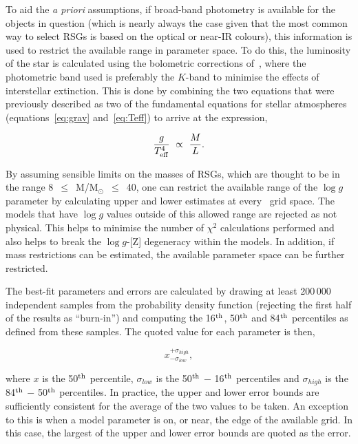 To aid the {\it a priori} assumptions, if broad-band photometry is available for the objects in question
(which is nearly always the case given that the most common way to select RSGs is based on the optical or near-IR colours), this information is used to restrict the available range in parameter space.
To do this, the luminosity of the star is calculated using the bolometric corrections of~\citet{2013ApJ...767....3D}, where the photometric band used is preferably the $K$-band to minimise the effects of interstellar extinction.
This is done by combining the two equations that were previously described as two of the fundamental equations for stellar atmospheres (equations~\ref{eq:grav} and~\ref{eq:Teff}) to arrive at the expression,

\begin{equation}
    \frac{g}{T^{4}_{\rm eff}}~\propto~\frac{M}{L}.
\end{equation}

By assuming sensible limits on the masses of RSGs, which are thought to be in the range 8~$\leq$~M/M$_{\odot}$~$\leq$~40, one can restrict the available range of the $\log g$ parameter by calculating upper and lower estimates at every \Teff~grid space.
The models that have $\log g$ values outside of this allowed range are rejected as not physical.
This helps to minimise the number of $\chi^2$ calculations performed and also helps to break the $\log g$-[Z] degeneracy within the models.
In addition, if mass restrictions can be estimated, the available parameter space can be further restricted.

The best-fit parameters and errors are calculated by drawing at least 200\,000 independent samples from the probability density function (rejecting the first half of the results as ``burn-in'') and computing the
16$^{\rm th}$, 50$^{\rm th}$ and 84$^{\rm th}$ percentiles as defined from these samples.
The quoted value for each parameter is then,

\begin{equation}
     x_{-\sigma_{low}}^{+\sigma_{high}},
\end{equation}

where $x$ is the 50$^{\rm th}$ percentile, $\sigma_{low}$ is the 50$^{\rm th}$ $-$ 16$^{\rm th}$ percentiles and $\sigma_{high}$ is the 84$^{\rm th}$ $-$ 50$^{\rm th}$ percentiles.
In practice, the upper and lower error bounds are sufficiently consistent for the average of the two values to be taken.
An exception to this is when a model parameter is on, or near, the edge of the available grid.
In this case, the largest of the upper and lower error bounds are quoted as the error.


